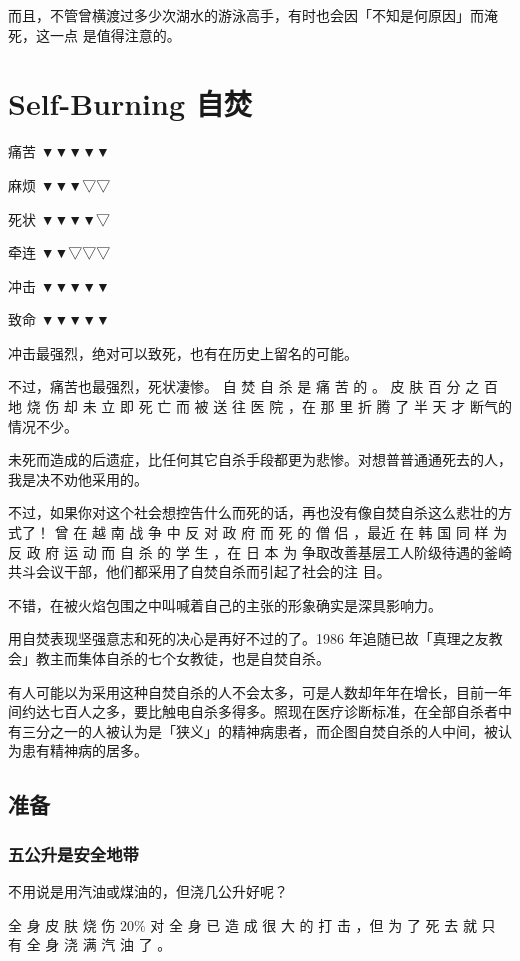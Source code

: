 \documentclass[UTF8]{ctexart}
\begin{document}
而且，不管曾横渡过多少次湖水的游泳高手，有时也会因「不知是何原因」而淹死，这一点
是值得注意的。


\newpage

\section{Self-Burning 自焚}

痛苦 ▼▼▼▼▼

麻烦 ▼▼▼▽▽

死状 ▼▼▼▼▽

牵连 ▼▼▽▽▽

冲击 ▼▼▼▼▼

致命 ▼▼▼▼▼

冲击最强烈，绝对可以致死，也有在历史上留名的可能。

不过，痛苦也最强烈，死状凄惨。
自 焚 自 杀 是 痛 苦 的 。
皮 肤 百 分 之 百 地 烧 伤 却 未 立 即 死 亡 而 被 送 往 医 院 ，在 那 里 折 腾 了 半 天 才 断气的情况不少。

未死而造成的后遗症，比任何其它自杀手段都更为悲惨。对想普普通通死去的人，我是决不劝他采用的。

不过，如果你对这个社会想控告什么而死的话，再也没有像自焚自杀这么悲壮的方式了！
曾 在 越 南 战 争 中 反 对 政 府 而 死 的 僧 侣 ，最近 在 韩 国 同 样 为 反 政 府 运 动 而 自 杀 的 学 生 ，在 日 本 为 争取改善基层工人阶级待遇的釜崎共斗会议干部，他们都采用了自焚自杀而引起了社会的注 目。

不错，在被火焰包围之中叫喊着自己的主张的形象确实是深具影响力。

用自焚表现坚强意志和死的决心是再好不过的了。1986 年追随已故「真理之友教会」教主而集体自杀的七个女教徒，也是自焚自杀。

有人可能以为采用这种自焚自杀的人不会太多，可是人数却年年在增长，目前一年间约达七百人之多，要比触电自杀多得多。照现在医疗诊断标准，在全部自杀者中有三分之一的人被认为是「狭义」的精神病患者，而企图自焚自杀的人中间，被认为患有精神病的居多。

\subsection{准备}

\subsubsection*{五公升是安全地带}

不用说是用汽油或煤油的，但浇几公升好呢？ 

全 身 皮 肤 烧 伤 $20\%$ 对 全 身 已 造 成 很 大 的 打 击 ，但 为 了 死 去 就 只 有 全 身 浇 满 汽 油 了 。
\end{document}
